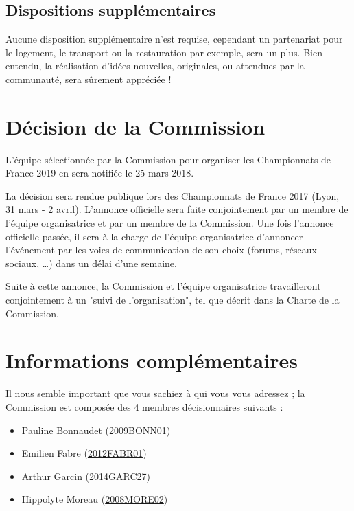 \documentclass[a4paper,12pt]{scrartcl}
\begin{document}
\subsection*{Dispositions supplémentaires}

Aucune disposition supplémentaire n'est requise, cependant un partenariat pour le logement, le transport ou la restauration par exemple, sera un plus.
Bien entendu, la réalisation d'idées nouvelles, originales, ou attendues par la communauté, sera sûrement appréciée !


\section*{Décision de la Commission}

L'équipe sélectionnée par la Commission pour organiser les Championnats de France 2019 en sera notifiée le 25 mars 2018.

La décision sera rendue publique lors des Championnats de France 2017 (Lyon, 31 mars - 2 avril). L'annonce officielle sera faite conjointement par un membre de l'équipe organisatrice et par un membre de la Commission. Une fois l'annonce officielle passée, il sera à la charge de l'équipe organisatrice d'annoncer l'événement par les voies de communication de son choix (forums, réseaux sociaux, …) dans un délai d'une semaine.

Suite à cette annonce, la Commission et l'équipe organisatrice travailleront conjointement à un "suivi de l'organisation", tel que décrit dans la Charte de la Commission.


\section*{Informations complémentaires}

Il nous semble important que vous sachiez à qui vous vous adressez ; la Commission est composée des 4 membres décisionnaires suivants :

\begin{itemize}
    \item Pauline Bonnaudet (\href{https://www.worldcubeassociation.org/results/p.php?i=2009BONN01}{2009BONN01})
    \item Emilien Fabre (\href{https://www.worldcubeassociation.org/results/p.php?i=2012FABR01}{2012FABR01})
       \item Arthur Garcin (\href{https://www.worldcubeassociation.org/results/p.php?i=2014GARC27}{2014GARC27})
    \item Hippolyte Moreau (\href{https://www.worldcubeassociation.org/results/p.php?i=2008MORE02}{2008MORE02})
\end{itemize}
\end{document}
